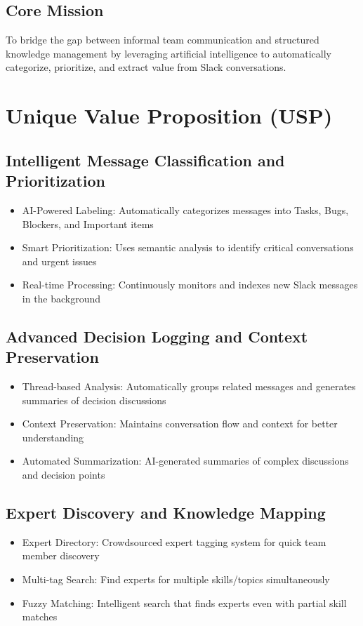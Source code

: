 \documentclass[12pt,a4paper]{article}
\begin{document}
\subsection{Core Mission}
To bridge the gap between informal team communication and structured knowledge management by leveraging artificial intelligence to automatically categorize, prioritize, and extract value from Slack conversations.
\section{Unique Value Proposition (USP)}
\subsection{Intelligent Message Classification and Prioritization}
\begin{itemize}
    \item AI-Powered Labeling: Automatically categorizes messages into Tasks, Bugs, Blockers, and Important items
    \item Smart Prioritization: Uses semantic analysis to identify critical conversations and urgent issues
    \item Real-time Processing: Continuously monitors and indexes new Slack messages in the background
\end{itemize}
\subsection{Advanced Decision Logging and Context Preservation}
\begin{itemize}
    \item Thread-based Analysis: Automatically groups related messages and generates summaries of decision discussions
    \item Context Preservation: Maintains conversation flow and context for better understanding
    \item Automated Summarization: AI-generated summaries of complex discussions and decision points
\end{itemize}
\subsection{Expert Discovery and Knowledge Mapping}
\begin{itemize}
    \item Expert Directory: Crowdsourced expert tagging system for quick team member discovery
    \item Multi-tag Search: Find experts for multiple skills/topics simultaneously
    \item Fuzzy Matching: Intelligent search that finds experts even with partial skill matches
\end{itemize}
\end{document}
